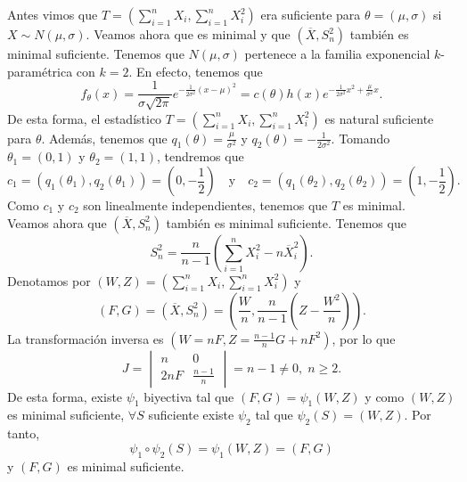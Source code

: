 \begin{eg}
Antes vimos que $\displaystyle T = \left(\sum^{n}_{i= 1}X_{i}, \sum^{n}_{i=1}X_{i}^{2}\right) $ era suficiente para $\displaystyle \theta = \left(\mu, \sigma \right) $ si $\displaystyle X \sim N\left(\mu, \sigma \right) $. Veamos ahora que es minimal y que $\displaystyle \left(\overline{X}, S^{2}_{n}\right) $ también es minimal suficiente. Tenemos que $\displaystyle N\left(\mu, \sigma \right) $ pertenece a la familia exponencial $\displaystyle k $-paramétrica con $\displaystyle k=2 $. En efecto, tenemos que 
\[f_{\theta}\left(x\right)=\frac{1}{\sigma\sqrt{2\pi }}e^{-\frac{1}{2\sigma^{2}}\left(x-\mu\right)^{2}}=c\left(\theta\right)h\left(x\right)e^{-\frac{1}{2\sigma^{2}}x^{2}+\frac{\mu}{\sigma^{2}}x} .\]
De esta forma, el estadístico $\displaystyle T = \left(\sum^{n}_{i=1}X_{i}, \sum^{n}_{i = 1}X_{i}^{2}\right) $ es natural suficiente para $\displaystyle \theta $. Además, tenemos que $\displaystyle q_{1}\left(\theta\right)=\frac{\mu}{\sigma^{2}} $ y $\displaystyle q_{2}\left(\theta\right)=-\frac{1}{2\sigma^{2}} $. Tomando $\displaystyle \theta_{1}=\left(0,1\right) $ y $\displaystyle \theta_{2}=\left(1,1\right) $, tendremos que 
\[c_{1}=\left(q_{1}\left(\theta_{1}\right), q_{2}\left(\theta_{1}\right)\right)=\left(0, - \frac{1}{2}\right)\quad \text{y} \quad c_{2}=\left(q_{1}\left(\theta_{2}\right), q_{2}\left(\theta_{2}\right)\right)=\left(1, - \frac{1}{2}\right) .\]
Como $\displaystyle c_{1} $ y $\displaystyle c_{2} $ son linealmente independientes, tenemos que $\displaystyle T $ es minimal. \\
Veamos ahora que $\displaystyle \left(\overline{X}, S^{2}_{n}\right) $ también es minimal suficiente. Tenemos que 
\[S^{2}_{n}=\frac{n}{n-1}\left(\sum^{n}_{i=1}X_{i}^{2}-n\overline{X}_{i}^{2}\right) .\]
Denotamos por $\displaystyle \left(W,Z\right)=\left(\sum^{n}_{i=1}X_{i}, \sum^{n}_{i=1}X_{i}^{2}\right) $ y
\[\left(F,G\right)=\left(\overline{X}, S^{2}_{n}\right)=\left(\frac{W}{n}, \frac{n}{n-1}\left(Z-\frac{W^{2}}{n}\right)\right) .\]
La transformación inversa es $\displaystyle \left(W = nF, Z = \frac{n-1}{n}G + n F^{2}\right) $, por lo que 
\[J = \begin{vmatrix} n & 0 \\ 2nF & \frac{n-1}{n} \end{vmatrix} =n-1\neq 0, \; n \geq 2 .\]
De esta forma, existe $\displaystyle \psi_{1} $ biyectiva tal que $\displaystyle \left(F,G\right)=\psi_{1}\left(W,Z\right) $ y como $\displaystyle \left(W,Z\right) $ es minimal suficiente, $\displaystyle \forall S $ suficiente existe $\displaystyle \psi_{2} $ tal que $\displaystyle \psi_{2}\left(S\right)=\left(W,Z\right) $. Por tanto, 
\[\psi_{1}\circ\psi_{2}\left(S\right)=\psi_{1}\left(W,Z\right)=\left(F,G\right) \]
y $\displaystyle \left(F,G\right) $ es minimal suficiente. 
\end{eg}
